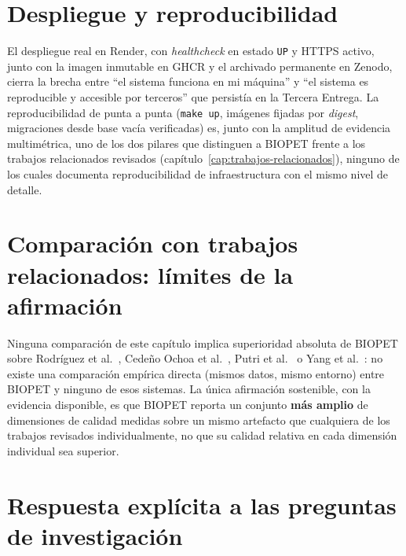\section{Despliegue y reproducibilidad}

El despliegue real en Render, con \emph{healthcheck} en estado \texttt{UP}
y HTTPS activo, junto con la imagen inmutable en GHCR y el archivado
permanente en Zenodo, cierra la brecha entre ``el sistema funciona en mi
m\'aquina'' y ``el sistema es reproducible y accesible por terceros'' que
persist\'ia en la Tercera Entrega. La reproducibilidad de punta a punta
(\texttt{make up}, im\'agenes fijadas por \emph{digest}, migraciones desde
base vac\'ia verificadas) es, junto con la amplitud de evidencia
multim\'etrica, uno de los dos pilares que distinguen a BIOPET frente a
los trabajos relacionados revisados (cap\'itulo~\ref{cap:trabajos-relacionados}),
ninguno de los cuales documenta reproducibilidad de infraestructura con el
mismo nivel de detalle.

\section{Comparaci\'on con trabajos relacionados: l\'imites de la afirmaci\'on}

Ninguna comparaci\'on de este cap\'itulo implica superioridad absoluta de
BIOPET sobre Rodr\'iguez et al.~\cite{rodriguez2024oscrum}, Cede\~no Ochoa
et al.~\cite{cedeno2021veterinaria}, Putri et al.~\cite{putri2017perftesting}
o Yang et al.~\cite{yang2026tokentimebomb}: no existe una comparaci\'on
emp\'irica directa (mismos datos, mismo entorno) entre BIOPET y ninguno de
esos sistemas. La \'unica afirmaci\'on sostenible, con la evidencia
disponible, es que BIOPET reporta un conjunto \textbf{m\'as amplio} de
dimensiones de calidad medidas sobre un mismo artefacto que cualquiera de
los trabajos revisados individualmente, no que su calidad relativa en cada
dimensi\'on individual sea superior.

\section{Respuesta expl\'icita a las preguntas de investigaci\'on}
\label{sec:respuestas-rq}

